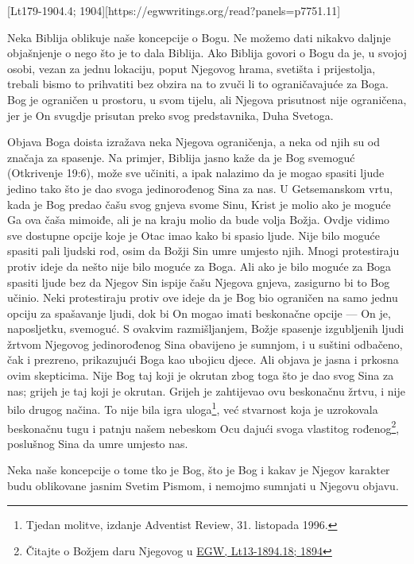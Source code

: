 [Lt179-1904.4; 1904][https://egwwritings.org/read?panels=p7751.11]

Neka Biblija oblikuje naše koncepcije o Bogu. Ne možemo dati nikakvo daljnje objašnjenje o  nego što je to dala Biblija. Ako Biblija govori o Bogu da je, u svojoj osobi, vezan za jednu lokaciju, poput Njegovog hrama, svetišta i prijestolja, trebali bismo to prihvatiti bez obzira na to zvuči li to ograničavajuće za Boga. Bog je ograničen u prostoru, u svom tijelu, ali Njegova prisutnost nije ograničena, jer je On svugdje prisutan preko svog predstavnika, Duha Svetoga.

Objava Boga doista izražava neka Njegova ograničenja, a neka od njih su od značaja za spasenje. Na primjer, Biblija jasno kaže da je Bog svemoguć (Otkrivenje 19:6), može sve učiniti, a ipak nalazimo da je mogao spasiti ljude jedino tako što je dao svoga jedinorođenog Sina za nas. U Getsemanskom vrtu, kada je Bog predao čašu svog gnjeva svome Sinu, Krist je molio ako je moguće Ga ova čaša mimoiđe, ali je na kraju molio da bude volja Božja. Ovdje vidimo sve dostupne opcije koje je Otac imao kako bi spasio ljude. Nije bilo moguće spasiti pali ljudski rod, osim da Božji Sin umre umjesto njih. Mnogi protestiraju protiv ideje da nešto nije bilo moguće za Boga. Ali ako je bilo moguće za Boga spasiti ljude bez da Njegov Sin ispije čašu Njegova gnjeva, zasigurno bi to Bog učinio. Neki protestiraju protiv ove ideje da je Bog bio ograničen na samo jednu opciju za spašavanje ljudi, dok bi On mogao imati beskonačne opcije — On je, naposljetku, svemoguć. S ovakvim razmišljanjem, Božje spasenje izgubljenih ljudi žrtvom Njegovog jedinorođenog Sina obavijeno je sumnjom, i u suštini odbačeno, čak i prezreno, prikazujući Boga kao ubojicu djece. Ali objava je jasna i prkosna ovim skepticima. Nije Bog taj koji je okrutan zbog toga što je dao svog Sina za nas; grijeh je taj koji je okrutan. Grijeh je zahtijevao ovu beskonačnu žrtvu, i nije bilo drugog načina. To nije bila igra uloga\footnote{Tjedan molitve, izdanje Adventist Review, 31. listopada 1996.}, već stvarnost koja je uzrokovala beskonačnu tugu i patnju našem nebeskom Ocu dajući svoga vlastitog rođenog\footnote{Čitajte o Božjem daru Njegovog  u \href{https://egwwritings.org/?ref=en_Lt13-1894.18&para=5486.24}{{EGW, Lt13-1894.18; 1894}}}, poslušnog Sina da umre umjesto nas.

Neka naše koncepcije o tome tko je Bog, što je Bog i kakav je Njegov karakter budu oblikovane jasnim Svetim Pismom, i nemojmo sumnjati u Njegovu objavu.
